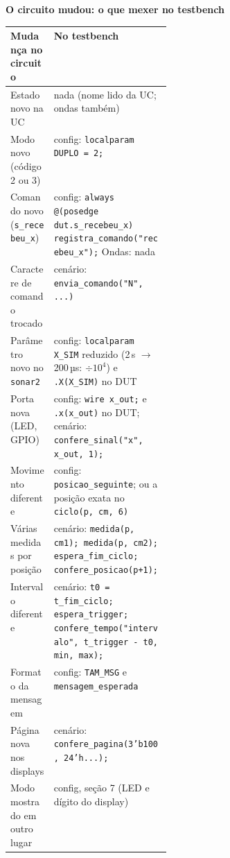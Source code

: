 \documentclass[9pt,a4paper]{extarticle}
\newcommand{\s}[1]{\texttt{#1}}          %
\begin{document}
\noindent\begin{minipage}{\linewidth}
\textbf{O circuito mudou: o que mexer no testbench}\\[2pt]
\begin{tabularx}{\linewidth}{@{}>{\raggedright\arraybackslash}p{0.27\linewidth} Y@{}}
\toprule
Mudança no circuito & No testbench \\
\midrule
Estado novo na UC & nada (nome lido da UC; ondas também) \\
Modo novo (código 2 ou 3) & config: \s{localparam DUPLO = 2;} \\
Comando novo (\s{s\_recebeu\_x}) & config: \s{always @(posedge dut.s\_recebeu\_x) registra\_comando("recebeu\_x");} Ondas: nada \\
Caractere de comando trocado & cenário: \s{envia\_comando("N", ...)} \\
Parâmetro novo no \s{sonar2} & config: \s{localparam X\_SIM} reduzido (2\,s $\to$ 200\,µs: $\div 10^4$) e \s{.X(X\_SIM)} no DUT \\
Porta nova (LED, GPIO) & config: \s{wire x\_out;} e \s{.x(x\_out)} no DUT; cenário: \s{confere\_sinal("x", x\_out, 1);} \\
Movimento diferente & config: \s{posicao\_seguinte}; ou a posição exata no \s{ciclo(p, cm, 6)} \\
Várias medidas por posição & cenário: \s{medida(p, cm1); medida(p, cm2); espera\_fim\_ciclo; confere\_posicao(p+1);} \\
Intervalo diferente & cenário: \s{t0 = t\_fim\_ciclo; espera\_trigger; confere\_tempo("intervalo", t\_trigger - t0, min, max);} \\
Formato da mensagem & config: \s{TAM\_MSG} e \s{mensagem\_esperada} \\
Página nova nos displays & cenário: \s{confere\_pagina(3'b100, 24'h...);} \\
Modo mostrado em outro lugar & config, seção 7 (LED e dígito do display) \\
\bottomrule
\end{tabularx}
\end{minipage}
\end{document}
